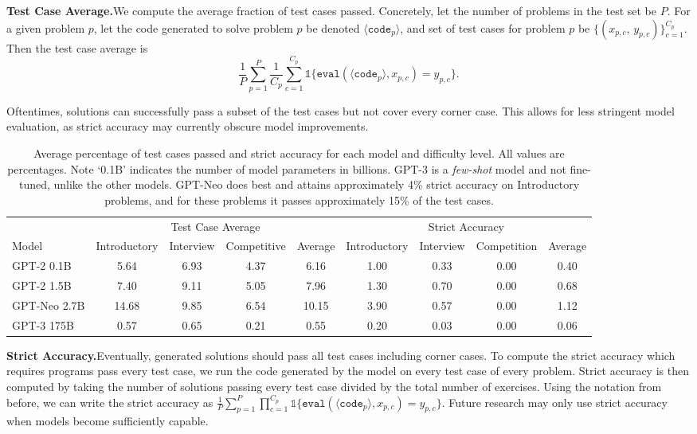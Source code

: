 \documentclass{article}
\begin{document}
\textbf{Test Case Average.}\quad We compute the average fraction of test cases passed. 
Concretely, let the number of problems in the test set be $P$. For a given problem $p$, let the code generated to solve problem $p$ be denoted $\langle\texttt{code}_p\rangle$, and set of test cases for problem $p$ be $\{(x_{p,c},\, y_{p,c})\}_{c=1}^{C_p}$. Then the test case average is 
\[
\frac{1}{P}\sum_{p=1}^P \frac{1}{C_p} \sum_{c=1}^{C_p} \mathds{1}\{\texttt{eval}(\langle\texttt{code}_p\rangle,x_{p,c}) = y_{p,c}\}.
\]

Oftentimes, solutions can successfully pass a subset of the test cases but not cover every corner case. This allows for less stringent model evaluation, as strict accuracy may currently obscure model improvements.

\begin{table*}[t]
\setlength{\tabcolsep}{2pt}
\small
\centering
\begin{tabular}{lcccc|cccc}
\multicolumn{1}{l}{} &  \multicolumn{4}{c}{Test Case Average} & \multicolumn{4}{c}{Strict Accuracy} \\
Model       & Introductory & Interview & Competitive &  Average & Introductory & Interview & Competition &  Average \\

\toprule
GPT-2 0.1B          & 5.64 & 6.93 & 4.37 & 6.16 & 1.00 & 0.33 & 0.00 & 0.40 \\
GPT-2 1.5B          & 7.40 & 9.11 & 5.05 & 7.96 & 1.30 & 0.70 & 0.00 & 0.68 \\
GPT-Neo 2.7B        & 14.68 & 9.85 & 6.54 & 10.15 & 3.90 & 0.57 & 0.00 & 1.12 \\
GPT-3 175B        & 0.57 & 0.65 & 0.21 & 0.55 & 0.20 & 0.03 & 0.00 & 0.06 \\
\end{tabular}
\caption{Average percentage of test cases passed and strict accuracy for each model and difficulty level. All values are percentages. Note `0.1B' indicates the number of model parameters in billions. GPT-3 is a \emph{few-shot} model and not fine-tuned, unlike the other models. GPT-Neo does best and attains approximately 4\% strict accuracy on Introductory problems, and for these problems it passes approximately 15\% of the test cases.}
\label{tab:results}
\end{table*}

\textbf{Strict Accuracy.}\quad Eventually, generated solutions should pass all test cases including corner cases.
To compute the strict accuracy which requires programs pass every test case, we run the code generated by the model on every test case of every problem. Strict accuracy is then computed by taking the number of solutions passing every test case divided by the total number of exercises. Using the notation from before, we can write the strict accuracy as $\frac{1}{P}\sum_{p=1}^P \prod_{c=1}^{C_p} \mathds{1}\{\texttt{eval}(\langle\texttt{code}_p\rangle,x_{p,c}) = y_{p,c}\}.$ Future research may only use strict accuracy when models become sufficiently capable.
\end{document}
